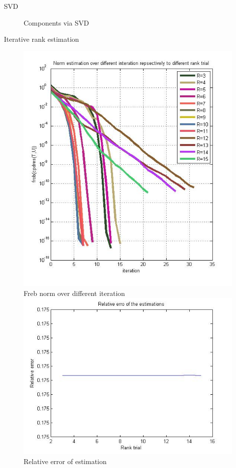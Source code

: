 \documentclass[t,12pt,english
\ifx\beamermode\undefined\else,\beamermode\fi
]{beamer}
\begin{document}
\begin{frame}{SVD}
\begin{figure}[!htbp]
\endminipage\hfill
\caption{\tiny Components via SVD}\label{A1}
\end{figure}

\end{frame}



\begin{frame}{Iterative rank estimation}

\begin{figure}[!htbp]
%
\centering
\includegraphics[width=1\textwidth]{7.jpg}\\
\tiny{Freb norm over different iteration}\label{a13}
\endminipage\hfill
{}%
\centering
\includegraphics[width=1\textwidth]{8.jpg}\\
\tiny{Relative error of estimation}\label{a14}
\endminipage\hfill
\end{figure}


\end{frame}
\end{document}
